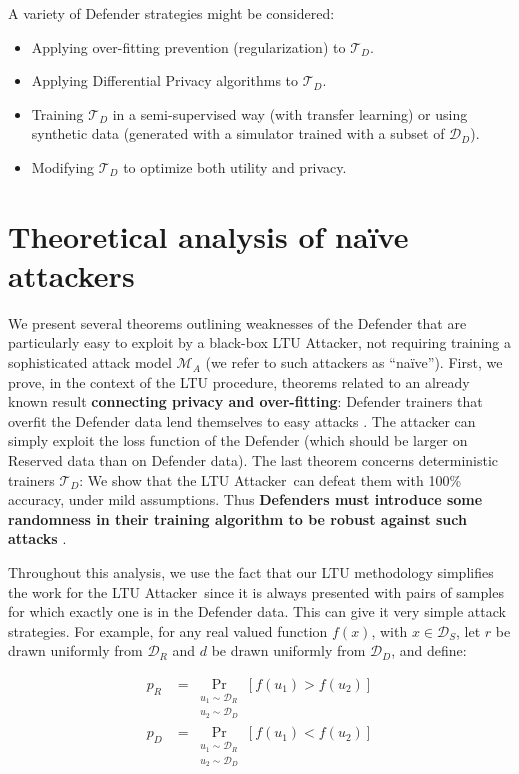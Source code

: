 \documentclass[letterpaper]{article}
\newcommand{\oracle}{LTU Attacker~}
\begin{document}
A variety of Defender strategies might be considered:
\begin{itemize}
    \item Applying over-fitting prevention (regularization) to $\mathcal{T}_D$.
    \item Applying Differential Privacy algorithms to $\mathcal{T}_D$.
    \item Training $\mathcal{T}_D$ in a semi-supervised way (with transfer learning) or using synthetic data (generated with a simulator trained with a subset of $\mathcal{D}_D$).
    \item Modifying $\mathcal{T}_D$ to optimize both utility and privacy.
\end{itemize}


\section{Theoretical analysis of na\"ive attackers}
We present several theorems outlining weaknesses of the Defender that are particularly easy to exploit by a black-box LTU Attacker, not requiring training a sophisticated attack model $\mathcal{M}_A$ (we refer to such attackers as ``na\"ive''). %
First, we prove, in the context of the LTU procedure, theorems related to an already known result {\bf connecting privacy and over-fitting}: Defender trainers that overfit the Defender data lend themselves to easy attacks  \cite{yeom2018privacy}. The attacker can simply exploit the loss function of the Defender (which should be larger on Reserved data than on Defender data).
The last theorem concerns deterministic trainers  $\mathcal{T}_D$: We show that the \oracle can defeat them with 100\% accuracy, under mild assumptions. Thus {\bf Defenders must introduce some randomness in their training algorithm to be robust against such attacks} \cite{Dwork2017}.

Throughout this analysis, we use the fact that our LTU methodology simplifies the work for the \oracle since it is always presented with pairs of samples for which exactly one is in the Defender data. This can give it very simple attack strategies.
For example, for any real valued function $f(x)$, with $x \in \mathcal{D}_S$, let $r$ be drawn uniformly from $\mathcal{D}_R$ and $d$ be drawn uniformly from $\mathcal{D}_D$, and define:

\begin{align}
p_R &= \mathop{Pr}_{\substack{u_1 \sim \mathcal{D}_R \\ u_2 \sim \mathcal{D}_D}}[f(u_1)>f(u_2)] \\
p_D &= \mathop{Pr}_{\substack{u_1 \sim \mathcal{D}_R \\ u_2 \sim \mathcal{D}_D}}[f(u_1)<f(u_2)]
\end{align}
\end{document}
